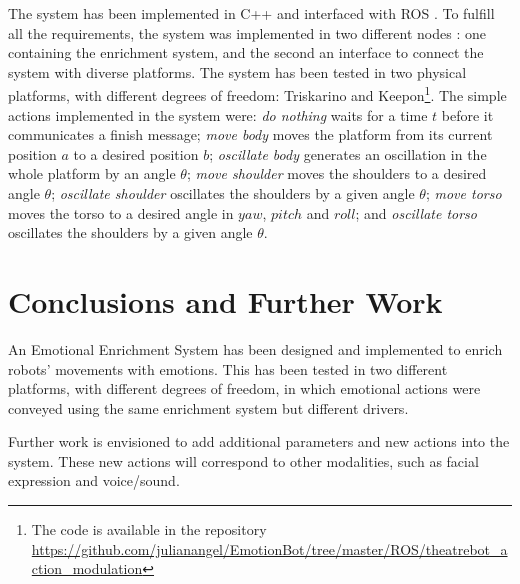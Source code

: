 \documentclass{sig-alternate-05-2015}
\begin{document}
The system has been implemented in C++ and interfaced with ROS %
. To fulfill all the requirements, the system was implemented in two different nodes %
: one containing the enrichment system, and the second an interface to connect the system with diverse platforms. The system has been tested in two physical platforms, with different degrees of freedom: Triskarino%
 and Keepon\footnote{ The code is available in the repository \url{https://github.com/julianangel/EmotionBot/tree/master/ROS/theatrebot_action_modulation}}. The simple actions implemented in the system were: \textit{do nothing} waits for a time $t$ before it communicates a finish message; \textit{move body} moves the platform from its current position $a$ to a desired position $b$; \textit{oscillate body} generates an oscillation in the whole platform by an angle $\theta$; \textit{move shoulder} moves the shoulders to a desired angle $\theta$; \textit{oscillate shoulder} oscillates the shoulders by a given angle $\theta$; \textit{move torso} moves the torso to a desired angle in $yaw$, $pitch$ and $roll$; and \textit{oscillate torso} oscillates the shoulders by a given angle $\theta$. %

\section{Conclusions and Further Work}

An Emotional Enrichment System has been designed and implemented to enrich robots' movements with emotions. %
This has been tested in two different platforms, with different degrees of freedom, in which emotional actions were conveyed using the same enrichment system but different drivers. 

Further work is envisioned to add additional parameters and new actions into the system. These new actions will correspond to other modalities, such as facial expression and voice/sound.


\end{document}
